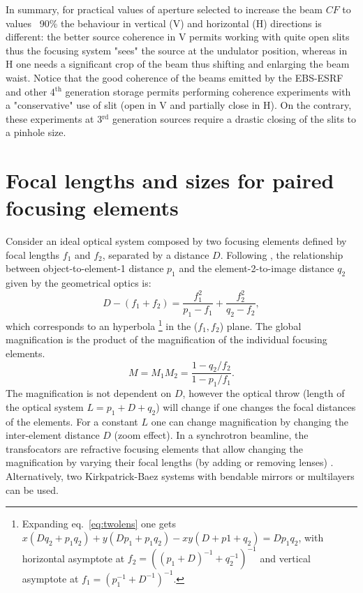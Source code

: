\documentclass[9pt,twocolumn,twoside]{osajnl}
\begin{document}
In summary, for practical values of aperture selected to increase the beam $CF$ to values ~90\% the behaviour in vertical (V) and horizontal (H) directions is different: the better source coherence in V permits working with quite open slits thus the focusing system "sees" the source at the undulator position, whereas in H one needs a significant crop of the beam thus shifting and enlarging the beam waist. Notice that the good coherence of the beams emitted by the EBS-ESRF and other 4$^{\text{th}}$ generation storage permits performing coherence experiments with a "conservative" use of slit (open in V and partially close in H). On the contrary, these experiments at 3$^{\text{rd}}$ generation sources require a drastic closing of the slits to a pinhole size.      

\section{Focal lengths and sizes for paired focusing elements}

Consider an ideal optical system composed by two focusing elements defined by focal lengths $f_1$ and $f_2$, separated by a distance $D$. Following \cite{Goodman85}, the relationship between object-to-element-1 distance $p_1$ and the element-2-to-image distance $q_2$ given by the geometrical optics is:
\begin{equation}
\label{eq:twolens}
    D-(f_1+f_2)=\frac{f_1^2}{p_1-f_1} + \frac{f_2^2}{q_2-f_2},
\end{equation}
which corresponds to an hyperbola
\footnote{Expanding eq.~\ref{eq:twolens} one gets $x(D q_2 + p_1 q_2) + y (D p_1 + p_1 q_2) - x y (D + p1 + q_2) = D p_1 q_2$,  with horizontal asymptote at $f_{2}=((p_1+D)^{-1}+q_2^{-1})^{-1}$ and vertical asymptote at $f_{1}=(p_1^{-1}+D^{-1})^{-1}$.} in the ($f_1,f_2$) plane.
The global magnification is the product of the magnification of the individual focusing elements.
\begin{equation}
\label{eq:magnification}
    M=M_1 M_2=\frac{1-q_2/f_2}{1-p_1/f_1}.
\end{equation}
The magnification is not dependent on $D$, however the optical throw (length of the optical system $L=p_1+D+q_2$) will change if one changes the focal distances of the elements. For a constant $L$ one can change magnification by changing the inter-element distance $D$ (zoom effect). In a synchrotron beamline, the transfocators are refractive focusing elements that allow changing the magnification by varying their focal lengths (by adding or removing lenses) \cite{Vaughan:kv5084}. Alternatively, two Kirkpatrick-Baez systems with bendable mirrors or multilayers can be used. 
\end{document}
